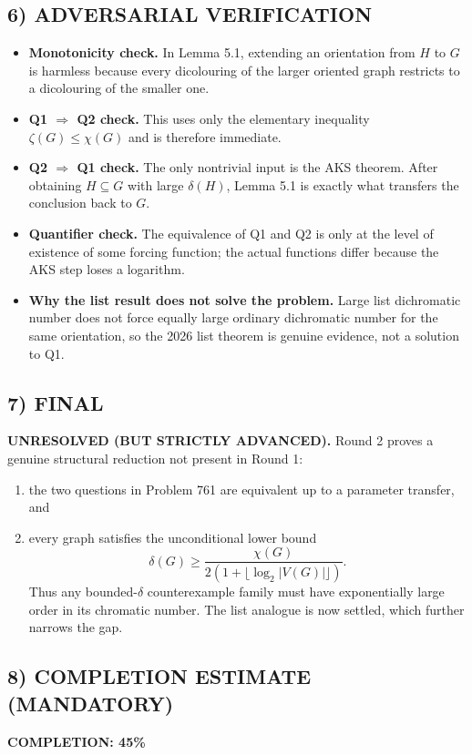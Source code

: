\subsection*{6) ADVERSARIAL VERIFICATION}
\begin{itemize}
\item \textbf{Monotonicity check.} In Lemma 5.1, extending an orientation from $H$ to $G$ is harmless because every dicolouring of the larger oriented graph restricts to a dicolouring of the smaller one.
\item \textbf{Q1 $\Rightarrow$ Q2 check.} This uses only the elementary inequality $\zeta(G)\le \chi(G)$ and is therefore immediate.
\item \textbf{Q2 $\Rightarrow$ Q1 check.} The only nontrivial input is the AKS theorem. After obtaining $H\subseteq G$ with large $\delta(H)$, Lemma 5.1 is exactly what transfers the conclusion back to $G$.
\item \textbf{Quantifier check.} The equivalence of Q1 and Q2 is only at the level of existence of some forcing function; the actual functions differ because the AKS step loses a logarithm.
\item \textbf{Why the list result does not solve the problem.} Large list dichromatic number does not force equally large ordinary dichromatic number for the same orientation, so the 2026 list theorem is genuine evidence, not a solution to Q1.
\end{itemize}

\subsection*{7) FINAL}
\textbf{UNRESOLVED (BUT STRICTLY ADVANCED).}
Round 2 proves a genuine structural reduction not present in Round 1:
\begin{enumerate}
\item the two questions in Problem 761 are equivalent up to a parameter transfer, and
\item every graph satisfies the unconditional lower bound
\[
\delta(G)\ge \frac{\chi(G)}{2(1+\lfloor\log_2 |V(G)|\rfloor)}.
\]
Thus any bounded-$\delta$ counterexample family must have exponentially large order in its chromatic number. The list analogue is now settled, which further narrows the gap.
\end{enumerate}

\subsection*{8) COMPLETION ESTIMATE (MANDATORY)}
\textbf{COMPLETION: 45\%}

